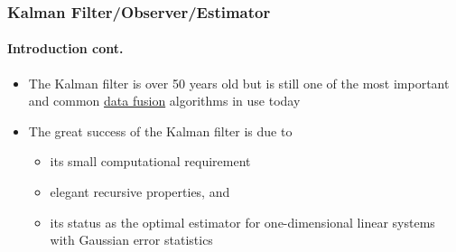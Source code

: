 \begin{frame}\pw\Large
\frametitle{Kalman Filter/Observer/Estimator}
\framesubtitle{Introduction \tiny cont.}
\begin{itemize}
\item The Kalman filter is over 50 years old but is still one of the most important and common \underline{data fusion} algorithms in use today
\item The great success of the Kalman filter is due to 
\begin{itemize}\scriptsize
\item its small computational requirement
\item elegant recursive properties, and 
\item its status as the optimal estimator for one-dimensional linear systems with Gaussian error statistics
\end{itemize}
\end{itemize}
\end{frame}



